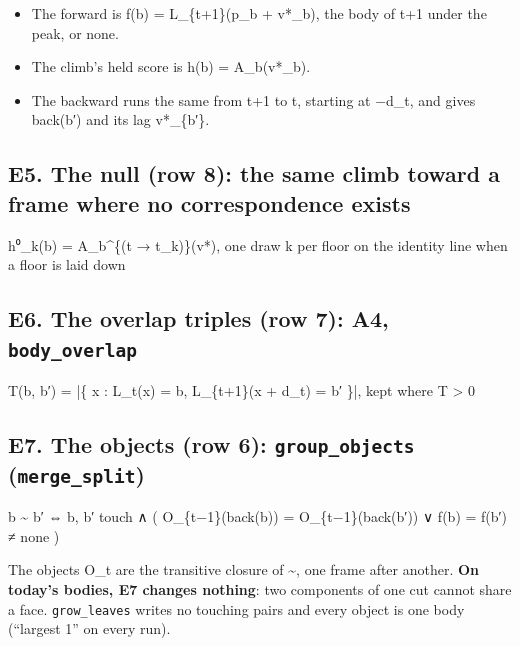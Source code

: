 \begin{itemize}
\item The forward is f(b) = L\_\allowbreak{}\{t+1\}(p\_\allowbreak{}b + v*\_\allowbreak{}b), the body of t+1 under the peak, or none.
\item The climb's held score is h(b) = A\_\allowbreak{}b(v*\_\allowbreak{}b).
\item The backward runs the same from t+1 to t, starting at −d\_\allowbreak{}t, and gives back(b′) and its lag v*\_\allowbreak{}\{b′\}.
\end{itemize}

\subsection{\texorpdfstring{E5. The null (row 8): the same climb toward a frame where no correspondence exists}{E5. The null (row 8): the same climb toward a frame where no correspondence exists}}

h⁰\_\allowbreak{}k(b) = A\_\allowbreak{}b\textasciicircum{}\{(t → t\_\allowbreak{}k)\}(v*),  one draw k per floor on the identity line when a floor is laid down

\subsection{\texorpdfstring{E6. The overlap triples (row 7): A4, \texttt{body\_\allowbreak{}overlap}}{E6. The overlap triples (row 7): A4, body\_overlap}}

T(b, b′) = |\{ x : L\_\allowbreak{}t(x) = b, L\_\allowbreak{}\{t+1\}(x + d\_\allowbreak{}t) = b′ \}|,  kept where T > 0

\subsection{\texorpdfstring{E7. The objects (row 6): \texttt{group\_\allowbreak{}objects} (\texttt{merge\_\allowbreak{}split})}{E7. The objects (row 6): group\_objects (merge\_split)}}

b \textasciitilde{} b′ ⇔ b, b′ touch ∧ ( O\_\allowbreak{}\{t−1\}(back(b)) = O\_\allowbreak{}\{t−1\}(back(b′)) ∨ f(b) = f(b′) ≠ none )

The objects O\_\allowbreak{}t are the transitive closure of \textasciitilde{}, one frame after another. \textbf{On today's bodies, E7 changes nothing}: two components of one cut cannot share a face. \texttt{grow\_\allowbreak{}leaves} writes no touching pairs and every object is one body (“largest 1” on every run).

